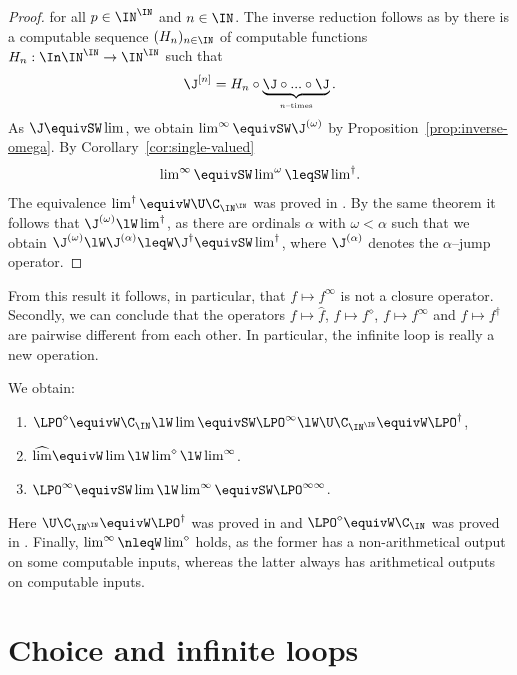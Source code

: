 \begin{proof}
for all $p\in\IN^\IN$ and $n\in\IN$.
The inverse reduction follows as by \cite[Theorem~2.14]{Bra18} there is a computable sequence $(H_n)_{n\in\IN}$ of computable
functions $H_n:\In\IN^\IN\to\IN^\IN$ such that
\[\J^{[n]}=H_n\circ\underbrace{\J\circ...\circ\J}_{\mbox{\tiny $n$--times}}.\]
As $\J\equivSW\lim$, we obtain $\lim^\infty\equivSW\J^{(\omega)}$ by Proposition~\ref{prop:inverse-omega}.
By Corollary~\ref{cor:single-valued}
\[\mbox{$\lim^\infty\equivSW\lim^\omega\leqSW\lim^\dagger$}.\]
The equivalence $\lim^\dagger\equivW\U\C_{\IN^\IN}$ was proved in \cite[Theorem~80]{Pau15}.
By the same theorem it follows that $\J^{(\omega)}\lW\lim^\dagger$, as 
there are ordinals $\alpha$ with $\omega<\alpha$ such that we obtain $\J^{(\omega)}\lW\J^{(\alpha)}\leqW\J^\dagger\equivSW\lim^\dagger$, where $\J^{(\alpha)}$ denotes the $\alpha$--jump operator.
\end{proof}

\noindent
From this result it follows, in particular, that $f\mapsto f^\infty$ is not a closure operator.
Secondly, we can conclude that the operators $f\mapsto\widehat{f}$, $f\mapsto f^\diamond$,
$f\mapsto f^\infty$ and $f\mapsto f^\dagger$ are pairwise different from each other.
In particular, the infinite loop is really a new operation.

\begin{cor}
We obtain:
\begin{enumerate}
\item $\LPO^\diamond\equivW\C_\IN\lW\lim\equivSW\LPO^\infty\lW\U\C_{\IN^\IN}\equivW \LPO^\dagger$,
\item $\widehat{\lim}\equivW\lim\lW\lim^\diamond\lW\lim^\infty$.
\item $\LPO^\infty\equivSW\lim\lW\lim^\infty\equivSW\LPO^{\infty\infty}$.
\end{enumerate}
\end{cor}

\noindent
Here $\U\C_{\IN^\IN}\equivW\LPO^\dagger$ was proved in \cite[Theorem~80]{Pau15}
and $\LPO^\diamond\equivW\C_\IN$ was proved in \cite[Proposition~10]{NP18}.
Finally, $\lim^\infty\nleqW\lim^\diamond$ holds, as the former has a non-arithmetical output on
some computable inputs, whereas the latter always has arithmetical outputs on computable inputs.


\section{Choice and infinite loops}
\label{sec:choice}

